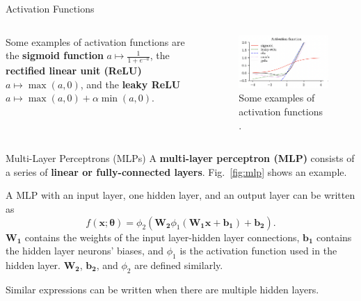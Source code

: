 \documentclass{beamer}
\begin{document}
\begin{frame}{Activation Functions}
    \begin{columns}
            Some examples of activation functions are the \textbf{sigmoid function} $a \mapsto \frac{1}{1 + e^{-a}}$, the \textbf{rectified linear unit (ReLU)} $a \mapsto \max(a, 0)$, and the \textbf{leaky ReLU} $a \mapsto\max(a, 0) + \alpha\min(a, 0)$.
            \begin{figure}
                \centering
                \includegraphics[scale=0.5]{activation_functions}
                \caption{Some examples of activation functions \cite{pml2Book}.}
                \label{fig:activation_functions}
            \end{figure}
    \end{columns}
\end{frame}

\begin{frame}{Multi-Layer Perceptrons (MLPs)}
    A \textbf{multi-layer perceptron (MLP)} consists of a series of \textbf{linear or fully-connected layers}. Fig.~\ref{fig:mlp} shows an example.
    
    \medskip
    
    A MLP with an input layer, one hidden layer, and an output layer can be written as
    \[
    f(\boldsymbol{x}; \boldsymbol{\theta}) = \phi_2(\boldsymbol{W_2}\phi_1(\boldsymbol{W_1}\boldsymbol{x} + \boldsymbol{b_1}) + \boldsymbol{b_2}).
    \]
    $\boldsymbol{W_1}$ contains the weights of the input layer-hidden layer connections, $\boldsymbol{b_1}$ contains the hidden layer neurons' biases, and $\phi_1$ is the activation function used in the hidden layer. $\boldsymbol{W_2}$, $\boldsymbol{b_2}$, and $\phi_2$ are defined similarly.
    
    \medskip
    
    Similar expressions can be written when there are multiple hidden layers.
\end{frame}
\end{document}
